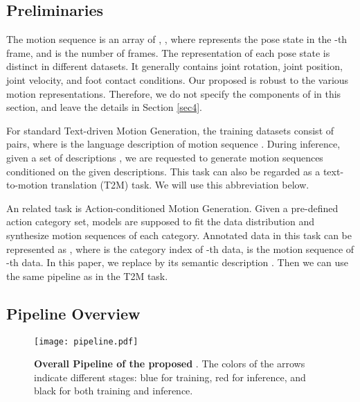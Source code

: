 \subsection{Preliminaries}\label{sec3_1}

The motion sequence  is an array of , , where  represents the pose state in the -th frame, and  is the number of frames. The representation of each pose state  is distinct in different datasets. It generally contains joint rotation, joint position, joint velocity, and foot contact conditions. Our proposed \name is robust to the various motion representations. Therefore, we do not specify the components of  in this section, and leave the details in Section \ref{sec4}. 

For standard Text-driven Motion Generation, the training datasets consist of  pairs, where  is the language description of motion sequence . During inference, given a set of descriptions , we are requested to generate motion sequences conditioned on the given descriptions. This task can also be regarded as a text-to-motion translation (T2M) task. We will use this abbreviation below.

An related task is Action-conditioned Motion Generation. Given a pre-defined action category set, models are supposed to fit the data distribution and synthesize motion sequences of each category. Annotated data in this task can be represented as , where  is the category index of -th data,  is the motion sequence of -th data. In this paper, we replace  by its semantic description . Then we can use the same pipeline as in the T2M task.


\subsection{Pipeline Overview}\label{sec3_2}

\begin{figure*}[t]
    \centering
    \texttt{[image: pipeline.pdf]}
    \caption{\textbf{Overall Pipeline of the proposed \name}. The colors of the arrows indicate different stages: blue for training, red for inference, and black for both training and inference.}
    \label{fig:pipeline}
\end{figure*}

